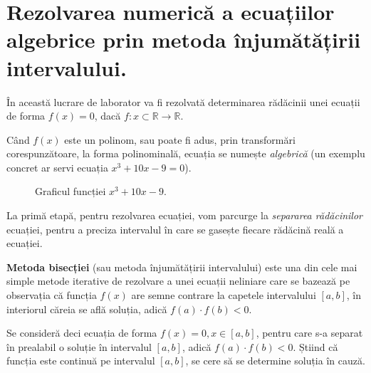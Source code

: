 \section{Rezolvarea numerică a ecuațiilor algebrice prin metoda înjumătățirii intervalului.}

În această lucrare de laborator va fi rezolvată determinarea rădăcinii unei ecuații de 
forma $f(x)=0$, dacă $f: x\subset \mathbb{R} \rightarrow \mathbb{R}$. \par
Când $f(x)$ este un polinom, sau poate fi adus, prin transformări corespunzătoare, la 
forma polinominală, ecuația se numește \textit{algebrică} (un exemplu concret ar servi 
ecuația $x^3+10x-9=0$). \par

\begin{figure}[H]
    \centering
    \caption{Graficul funcției $x^3 + 10x - 9$.}
    \label{fig:grafic}
\end{figure}

La primă etapă, pentru rezolvarea ecuației, vom parcurge la \textit{separarea 
rădăcinilor} ecuației, pentru a preciza intervalul în care se gasește fiecare rădăcină 
reală a ecuației. \par

\textbf{Metoda bisecției} (sau metoda înjumătățirii intervalului) este una din cele mai simple 
metode iterative de rezolvare a unei ecuații neliniare care se bazează pe observația 
că funcția $f(x)$ are semne contrare la capetele intervalului $[a,b]$, în interiorul 
căreia se află soluția, adică $f(a) \cdot f(b) < 0$. \par

Se consideră deci ecuația de forma $f(x)=0, x \in [a,b]$, pentru care s-a separat în 
prealabil o soluție în intervalul $[a,b]$, adică $f(a) \cdot f(b) < 0$. Știind că 
funcția este continuă pe intervalul $[a,b]$, se cere să se determine soluția în cauză. \par

